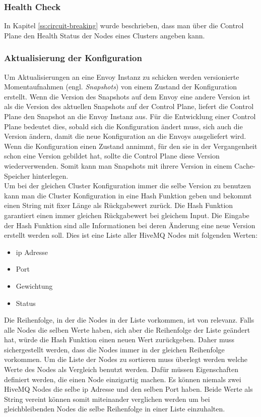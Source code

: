 \subsubsection{Health Check}
In Kapitel \ref{ss:circuit-breaking} wurde beschrieben, dass man über die Control Plane den Health Status der Nodes eines Clusters angeben kann.


\subsubsection{Aktualisierung der Konfiguration}
Um Aktualisierungen an eine Envoy Instanz zu schicken werden versionierte Momentaufnahmen (engl. \textit{Snapshots}) von einem Zustand der Konfiguration erstellt. Wenn die Version des Snapshots auf dem Envoy eine andere Version ist als die Version des aktuellen Snapshots auf der Control Plane, liefert die Control Plane den Snapshot an die Envoy Instanz aus.
Für die Entwicklung einer Control Plane bedeutet dies, sobald sich die Konfiguration ändert muss, sich auch die Version ändern, damit die neue Konfiguration an die Envoys ausgeliefert wird. Wenn die Konfiguration einen Zustand annimmt, für den sie in der Vergangenheit schon eine Version gebildet hat, sollte die Control Plane diese Version wiederverwenden. Somit kann man Snapshots mit ihrere Version in einem Cache-Speicher hinterlegen.
\\
Um bei der gleichen Cluster Konfiguration immer die selbe Version zu benutzen kann man die Cluster Konfiguration in eine Hash Funktion geben und bekommt einen String mit fixer Länge als Rückgabewert zurück. Die Hash Funktion garantiert einen immer gleichen Rückgabewert bei gleichem Input.
Die Eingabe der Hash Funktion sind alle Informationen bei deren Änderung eine neue Version erstellt werden soll. Dies ist eine Liste aller HiveMQ Nodes mit folgenden Werten:
\begin{itemize}
  \item \ac{ip} Adresse
  \item Port
  \item Gewichtung
  \item Status
\end{itemize}
Die Reihenfolge, in der die Nodes in der Liste vorkommen, ist von relevanz. Falls alle Nodes die selben Werte haben, sich aber die Reihenfolge der Liste geändert hat, würde die Hash Funktion einen neuen Wert zurückgeben. Daher muss sichergestellt werden, dass die Nodes immer in der gleichen Reihenfolge vorkommen. Um die Liste der Nodes zu sortieren muss überlegt werden welche Werte des Nodes als Vergleich benutzt werden. Dafür müssen Eigenschaften definiert werden, die einen Node einzigartig machen.
Es können niemals zwei HiveMQ Nodes die selbe \ac{ip} Adresse und den selben Port haben. Beide Werte als String vereint können somit miteinander verglichen werden um bei gleichbleibenden Nodes die selbe Reihenfolge in einer Liste einzuhalten.

